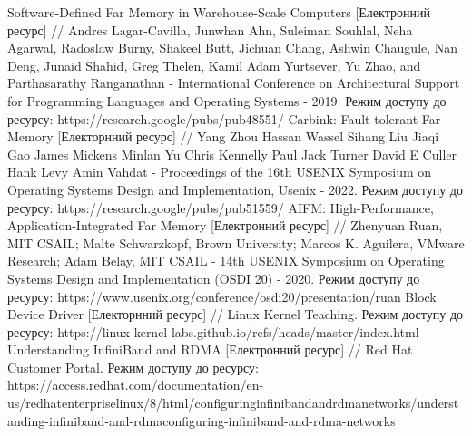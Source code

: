 Software-Defined Far Memory in Warehouse-Scale Computers [Електронний ресурс] // Andres Lagar-Cavilla, Junwhan Ahn, Suleiman Souhlal, Neha Agarwal, Radoslaw Burny, Shakeel Butt, Jichuan Chang, Ashwin Chaugule, Nan Deng, Junaid Shahid, Greg Thelen, Kamil Adam Yurtsever, Yu Zhao, and Parthasarathy Ranganathan - International Conference on Architectural Support for Programming Languages and Operating Systems - 2019. Режим доступу до ресурсу: https://research.google/pubs/pub48551/
Carbink: Fault-tolerant Far Memory [Електорнний ресурс] // Yang Zhou Hassan Wassel Sihang Liu Jiaqi Gao James Mickens Minlan Yu Chris Kennelly Paul Jack Turner David E Culler Hank Levy Amin Vahdat - Proceedings of the 16th USENIX Symposium on Operating Systems Design and Implementation, Usenix - 2022. Режим доступу до ресурсу: https://research.google/pubs/pub51559/
AIFM: High-Performance, Application-Integrated Far Memory [Електронний ресурс] // Zhenyuan Ruan, MIT CSAIL; Malte Schwarzkopf, Brown University; Marcos K. Aguilera, VMware Research; Adam Belay, MIT CSAIL - 14th USENIX Symposium on Operating Systems Design and Implementation (OSDI 20) - 2020. Режим доступу до ресурсу: https://www.usenix.org/conference/osdi20/presentation/ruan
Block Device Driver [Електорнний ресурс] // Linux Kernel Teaching. Режим доступу до ресурсу: https://linux-kernel-labs.github.io/refs/heads/master/index.html
Understanding InfiniBand and RDMA [Електронний ресурс] // Red Hat Customer Portal. Режим доступу до ресурсу: https://access.redhat.com/documentation/en-us/red\textunderscore hat\textunderscore enterprise\textunderscore linux/8/html/configuring\textunderscore infiniband\textunderscore and\textunderscore rdma\textunderscore networks/understanding-infiniband-and-rdma\textunderscore configuring-infiniband-and-rdma-networks



